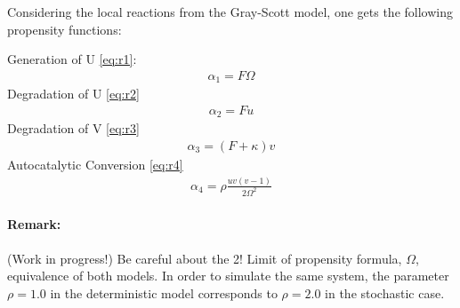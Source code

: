 Considering the local reactions from the Gray-Scott model, one gets the following propensity functions: \par
Generation of U \eqref{eq:r1}:
\begin{align}
\alpha_1 = F \Omega
\end{align}
Degradation of U \eqref{eq:r2}
\begin{align}
\alpha_2 = F u
\end{align}
Degradation of V \eqref{eq:r3}
\begin{align}
\alpha_3 = (F + \kappa) v
\end{align}
Autocatalytic Conversion \eqref{eq:r4}
\begin{align}
\alpha_4 = \rho \frac{u v (v-1)}{2 \Omega^2}
\end{align}
\paragraph{Remark:} (Work in progress!) Be careful about the 2! Limit of propensity formula, $\Omega$, equivalence of both models. In order to simulate the same system, the parameter $\rho = 1.0$ in the deterministic model corresponds to $\rho = 2.0$ in the stochastic case.